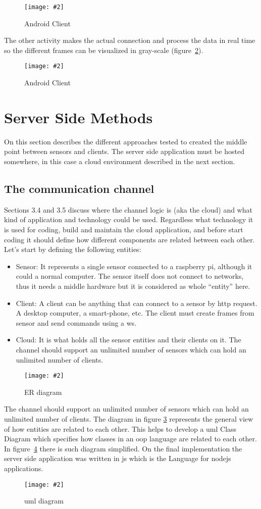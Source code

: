 \documentclass[hidelinks,11pt,a4paper,oneside,article]{memoir}
\newcommand{\putimage}[3][10] %
{
\begin{figure}[h]
	\centering
	\captionsetup{justification=centering}
	\texttt{[image: \#2]}
	\caption{#3}
	\label{fig:#2}
\end{figure}
}
\begin{document}
    \putimage[4]{android-client}{Android Client}

The other activity makes the actual connection and process the data in real time so the different frames can be visualized in gray-scale (figure~\ref{fig:android-client2}).

    \putimage[4]{android-client2}{Android Client}

\section{Server Side Methods}\label{sec:server-side-methods} 
On this section describes the different approaches tested to created the middle point between sensors and clients. The server side application must be hosted somewhere, in this case a cloud environment described in the next section.

\subsection{The communication channel}\label{sec:the-communication-channel}
Sections 3.4 and 3.5 discuss where the channel logic is (aka the cloud) and what kind of application and technology could be used. Regardless what technology it is used for coding, build and maintain the cloud application, and before start coding it should define how different components are related between each other.
Let’s start by defining the following entities:
\begin{itemize}
    \item Sensor: It represents a single sensor connected to a raspberry pi, although it could a normal computer. The sensor itself does not connect to networks, thus it needs a middle hardware but it is considered as whole “entity” here.
    \item Client: A client can be anything that can connect to a sensor by \gls{http} request. A desktop computer, a smart-phone, etc. The client must create frames from sensor and send commands using a \gls{ws}.
    \item Cloud: It is what holds all the sensor entities and their clients on it.
    The channel should support an unlimited number of sensors which can hold an unlimited number of clients.
\end{itemize}
\putimage[15]{channel-er}{ER diagram}
The channel should support an unlimited number of sensors which can hold an unlimited number of clients.
The diagram in figure \ref{fig:channel-er} represents the general view of how entities are related to each other. This helps to develop a \gls{uml} Class Diagram which specifies how classes in an \gls{oop} language are related to each other. In figure~\ref{fig:channel-uml} there is such diagram simplified.
On the final implementation the server side application was written in \gls{js} which is the Language for \gls{nodejs} applications.
\putimage[15]{channel-uml}{\gls{uml} diagram}
\end{document}
